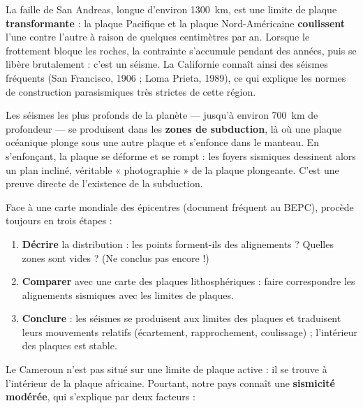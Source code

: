 \documentclass[11pt]{article}
\newcounter{popsec}
\newcounter{popsub}
\newcommand{\courssub}[1]{%
  \stepcounter{popsub}%
  \par\vspace{9pt}\noindent{\popxbold\fontsize{11.5}{13}\selectfont\color{popink}{\color{poporange}\thepopsec.\thepopsub}\hspace{6pt}#1}\par\nopagebreak\vspace{4pt}
}
\begin{document}
\begin{exemplebox}
La faille de San Andreas, longue d'environ \SI{1300}{km}, est une limite de plaque \textbf{transformante} : la plaque Pacifique et la plaque Nord-Américaine \textbf{coulissent} l'une contre l'autre à raison de quelques centimètres par an. Lorsque le frottement bloque les roches, la contrainte s'accumule pendant des années, puis se libère brutalement : c'est un séisme. La Californie connaît ainsi des séismes fréquents (San Francisco, 1906 ; Loma Prieta, 1989), ce qui explique les normes de construction parasismiques très strictes de cette région.
\end{exemplebox}

\begin{savaistu}
Les séismes les plus profonds de la planète — jusqu'à environ \SI{700}{km} de profondeur — se produisent dans les \textbf{zones de subduction}, là où une plaque océanique plonge sous une autre plaque et s'enfonce dans le manteau. En s'enfonçant, la plaque se déforme et se rompt : les foyers sismiques dessinent alors un plan incliné, véritable « photographie » de la plaque plongeante. C'est une preuve directe de l'existence de la subduction.
\end{savaistu}

\begin{methode}
Face à une carte mondiale des épicentres (document fréquent au BEPC), procède toujours en trois étapes :
\begin{enumerate}
\item \textbf{Décrire} la distribution : les points forment-ils des alignements ? Quelles zones sont vides ? (Ne conclus pas encore !)
\item \textbf{Comparer} avec une carte des plaques lithosphériques : faire correspondre les alignements sismiques avec les limites de plaques.
\item \textbf{Conclure} : les séismes se produisent aux limites des plaques et traduisent leurs mouvements relatifs (écartement, rapprochement, coulissage) ; l'intérieur des plaques est stable.
\end{enumerate}
\end{methode}

\courssub{Et le Cameroun dans tout cela ?}

Le Cameroun n'est pas situé sur une limite de plaque active : il se trouve à l'intérieur de la plaque africaine. Pourtant, notre pays connaît une \textbf{sismicité modérée}, qui s'explique par deux facteurs :
\end{document}
